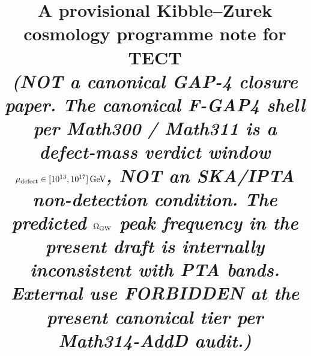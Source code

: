 



\title{A provisional Kibble--Zurek cosmology programme note for TECT
\\ \normalsize{\textit{(NOT a canonical GAP-4 closure paper. The
canonical F-GAP4 shell per Math300 / Math311 is a defect-mass
verdict window $\mu_{\rm defect} \in [10^{13}, 10^{17}]\,
\mathrm{GeV}$, NOT an SKA/IPTA non-detection condition. The
predicted $\Omega_{\rm GW}$ peak frequency in the present draft is
internally inconsistent with PTA bands. External use FORBIDDEN at
the present canonical tier per Math314-AddD audit.)}}}

